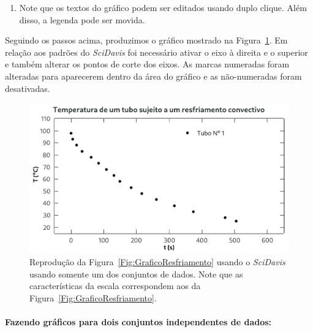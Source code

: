 \begin{enumerate}
\begin{itemize}
\begin{itemize}
                    \item escolher o número de marcas não numeradas (`\textsf{Minor Ticks}', marcas menores). Eixos opostos automaticamente terão as mesmas marcas menores;\footnote{Novamente, nem todo valor é possível.}
                    \item espelhar qualquer dos eixos marcando `\textsf{Inverted}'.
                \end{itemize}
        \end{itemize}
    \item Note que os textos do gráfico podem ser editados usando duplo clique. Além disso, a legenda pode ser movida.
\end{enumerate}

Seguindo os passos acima, produzimos o gráfico mostrado na Figura~\ref{Fig:ResultadoSciDavis1}. Em relação aos padrões do \emph{SciDavis} foi necessário ativar o eixo à direita e o superior e também alterar os pontos de corte dos eixos. As marcas numeradas foram alteradas para aparecerem dentro da área do gráfico e as não-numeradas foram desativadas.

\begin{figure}
\centering
\includegraphics[width=\linewidth]{Graphics/SciDavis/ResultadoSciDavis1.pdf}
\caption{Reprodução da Figura~\ref{Fig:GraficoResfriamento} usando o \emph{SciDavis} usando somente um dos conjuntos de dados. Note que as características da escala correspondem aos da Figura~\ref{Fig:GraficoResfriamento}.\label{Fig:ResultadoSciDavis1}}
\end{figure}

\pagebreak
\paragraph{Fazendo gráficos para dois conjuntos independentes de dados:}

